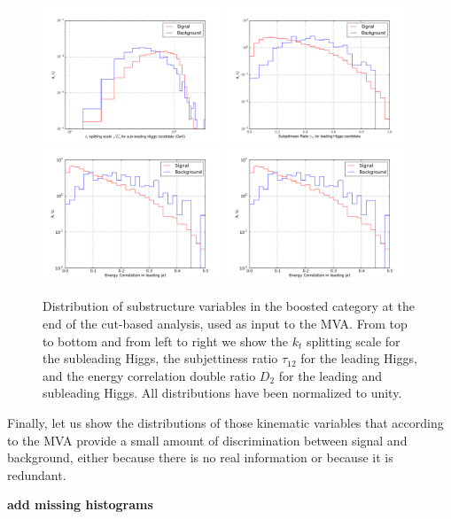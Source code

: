\begin{figure}[t]
  \begin{center}
    \includegraphics[width=0.48\textwidth]{plots/split12_H1_res_C1_boost.pdf} 
  \includegraphics[width=0.48\textwidth]{plots/tau21_h0_res_C1_boost.pdf}
  \includegraphics[width=0.48\textwidth]{plots/EEC_C2_h0_res_C1_boost.pdf}
  \includegraphics[width=0.48\textwidth]{plots/EEC_C2_h0_res_C1_boost.pdf}
  \caption{\small Distribution of substructure variables
    in the boosted category at the end of the cut-based
    analysis, used as input to the MVA.
    From top to bottom and from left to right we show  the
$k_t$ splitting scale for
the subleading Higgs, the subjettiness ratio $\tau_{12}$
for the leading Higgs,
and the energy correlation double ratio $D_2$
for the leading and subleading Higgs.
%
All distributions have been normalized to unity.
}
\label{fig:mva_substructure_1}
\end{center}
\end{figure}


Finally, let us show the distributions of those kinematic variables
that according to the MVA provide a small amount of discrimination
between signal and background, either because there is no real information or
because it is redundant.

{\bf add missing histograms}

